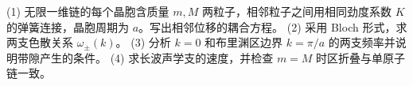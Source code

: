 (1) 无限一维链的每个晶胞含质量 \(m,M\) 两粒子，相邻粒子之间用相同劲度系数 \(K\) 的弹簧连接，晶胞周期为 \(a\)。写出相邻位移的耦合方程。
(2) 采用 Bloch 形式，求两支色散关系 \(\omega_\pm(k)\)。
(3) 分析 \(k=0\) 和布里渊区边界 \(k=\pi/a\) 的两支频率并说明带隙产生的条件。
(4) 求长波声学支的速度，并检查 \(m=M\) 时区折叠与单原子链一致。
